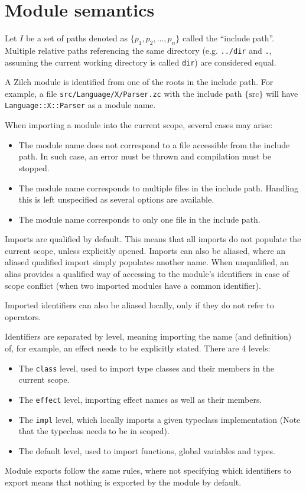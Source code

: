 \section{Module semantics}\label{sec:zilch-staticsem-modules}

Let $I$ be a set of paths denoted as $\{ p_1, p_2, \ldots, p_n \}$ called the ``include path''.
Multiple relative paths referencing the same directory (e.g. \verb|../dir| and \verb|.|, assuming the current working directory is called \verb|dir|) are considered equal.

A Zilch module is identified from one of the roots in the include path.
For example, a file \verb|src/Language/X/Parser.zc| with the include path $\{ \text{src} \}$ will have \verb|Language::X::Parser| as a module name.

When importing a module into the current scope, several cases may arise:
\begin{itemize}
	\item The module name does not correspond to a file accessible from the include path.
	      In such case, an error must be thrown and compilation must be stopped.
	\item The module name corresponds to multiple files in the include path.
	      Handling this is left unspecified as several options are available.
	\item The module name corresponds to only one file in the include path.
\end{itemize}

Imports are qualified by default.
This means that all imports do not populate the current scope, unless explicitly opened.
Imports can also be aliased, where an aliased qualified import simply populates another name.
When unqualified, an alias provides a qualified way of accessing to the module's identifiers in case of scope conflict (when two imported modules have a common identifier).

Imported identifiers can also be aliased locally, only if they do not refer to operators.

Identifiers are separated by level, meaning importing the name (and definition) of, for example, an effect needs to be explicitly stated.
There are 4 levels:
\begin{itemize}
	\item The \verb|class| level, used to import type classes and their members in the current scope.
	\item The \verb|effect| level, importing effect names as well as their members.
	\item The \verb|impl| level, which locally imports a given typeclass implementation (Note that the typeclass needs to be in scoped).
	\item The default level, used to import functions, global variables and types.
\end{itemize}


Module exports follow the same rules, where not specifying which identifiers to export means that nothing is exported by the module by default.
